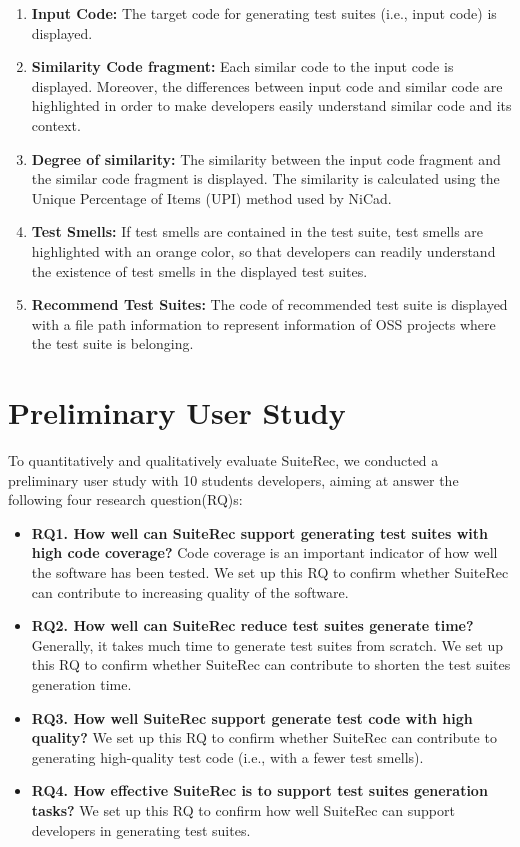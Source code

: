 \documentclass[conference]{IEEEtran}
\begin{document}
\begin{enumerate}
\renewcommand{\labelenumi}{(\arabic{enumi})}
\item{\textbf{Input Code:} The target code for generating test suites (i.e., input code) is displayed.}
\item{\textbf{Similarity Code fragment:} Each similar code to the input code is displayed. Moreover, the differences between input code and similar code are highlighted in order to make developers easily understand similar code and its context.}
\item{\textbf{Degree of similarity:} The similarity between the input code fragment and the similar code fragment is displayed. The similarity is calculated using the Unique Percentage of Items (UPI) method used by \textsf{NiCad}.}
\item{\textbf{Test Smells:} If test smells are contained in the test suite, test smells are highlighted with an orange color, so that developers can readily understand the existence of test smells in the displayed test suites.}
\item{\textbf{Recommend Test Suites:} The code of recommended test suite is displayed with a file path information to represent information of OSS projects where the test suite is belonging. }
\end{enumerate}


\section{Preliminary User Study}
\label{sec:userstudy}
To quantitatively and qualitatively evaluate \textsf{SuiteRec}, we conducted a preliminary user study with 10 students developers, aiming at answer the following four research question(RQ)s:

\begin{itemize}
\item \textbf{RQ1. How well can \textsf{SuiteRec} support generating test suites with high code coverage?} Code coverage is an important indicator of how well the software has been tested. We set up this RQ to confirm whether \textsf{SuiteRec} can contribute to increasing quality of the software.
\item \textbf{RQ2. How well can \textsf{SuiteRec} reduce test suites generate time?} Generally, it takes much time to generate test suites from scratch. We set up this RQ to confirm whether \textsf{SuiteRec} can contribute to shorten the test suites generation time.
\item \textbf{RQ3. How well \textsf{SuiteRec} support generate test code with high quality?} We set up this RQ to confirm whether \textsf{SuiteRec} can contribute to generating high-quality test code (i.e., with a fewer test smells).
\item \textbf{RQ4. How effective \textsf{SuiteRec} is to support test suites generation tasks?} We set up this RQ to confirm how well \textsf{SuiteRec} can support developers in generating test suites.
\end{itemize}
\end{document}
